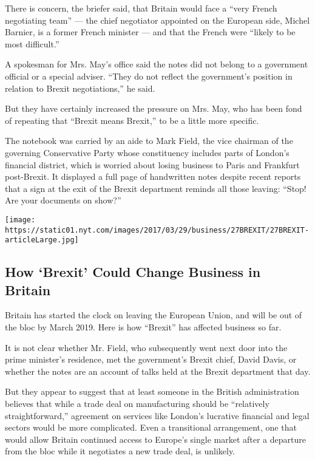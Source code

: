 There is concern, the briefer said, that Britain would face a ``very
French negotiating team'' --- the chief negotiator appointed on the
European side, Michel Barnier, is a former French minister --- and that
the French were ``likely to be most difficult.''

A spokesman for Mrs. May's office said the notes did not belong to a
government official or a special adviser. ``They do not reflect the
government's position in relation to Brexit negotiations,'' he said.

But they have certainly increased the pressure on Mrs. May, who has been
fond of repeating that ``Brexit means Brexit,'' to be a little more
specific.

The notebook was carried by an aide to Mark Field, the vice chairman of
the governing Conservative Party whose constituency includes parts of
London's financial district, which is worried about losing business to
Paris and Frankfurt post-Brexit. It displayed a full page of handwritten
notes despite recent reports that a sign at the exit of the Brexit
department reminds all those leaving: ``Stop! Are your documents on
show?''

\href{https://www.nytimes.com/interactive/2016/business/international/brexit-uk-what-happens-business.html}{}

\texttt{[image: https://static01.nyt.com/images/2017/03/29/business/27BREXIT/27BREXIT-articleLarge.jpg]}

\hypertarget{how-brexit-could-change-business-in-britain}{%
\subsection{How `Brexit' Could Change Business in
Britain}\label{how-brexit-could-change-business-in-britain}}

Britain has started the clock on leaving the European Union, and will be
out of the bloc by March 2019. Here is how ``Brexit'' has affected
business so far.

It is not clear whether Mr. Field, who subsequently went next door into
the prime minister's residence, met the government's Brexit chief, David
Davis, or whether the notes are an account of talks held at the Brexit
department that day.

But they appear to suggest that at least someone in the British
administration believes that while a trade deal on manufacturing should
be ``relatively straightforward,'' agreement on services like London's
lucrative financial and legal sectors would be more complicated. Even a
transitional arrangement, one that would allow Britain continued access
to Europe's single market after a departure from the bloc while it
negotiates a new trade deal, is unlikely.

